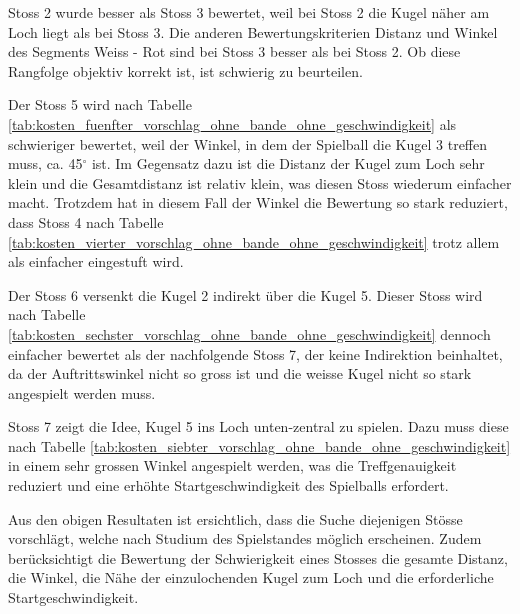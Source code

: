 Stoss 2 wurde besser als Stoss 3 bewertet, weil bei Stoss 2 die Kugel näher am Loch liegt als bei Stoss 3. Die anderen
Bewertungskriterien Distanz und Winkel des Segments \glqq Weiss - Rot\grqq{} sind bei Stoss 3 besser als bei Stoss 2.
Ob diese Rangfolge objektiv korrekt ist, ist schwierig zu beurteilen.

Der Stoss 5 wird nach Tabelle \ref{tab:kosten_fuenfter_vorschlag_ohne_bande_ohne_geschwindigkeit} als schwieriger bewertet, weil der Winkel, in dem der Spielball die Kugel 3 treffen muss, ca. 45$^{\circ}$ ist.
Im Gegensatz dazu ist die Distanz der Kugel zum Loch sehr klein und die Gesamtdistanz ist relativ klein, was diesen Stoss
wiederum einfacher macht. Trotzdem hat in diesem Fall der Winkel die Bewertung so stark reduziert, dass Stoss 4 nach
Tabelle \ref{tab:kosten_vierter_vorschlag_ohne_bande_ohne_geschwindigkeit} trotz allem als einfacher eingestuft wird.

Der Stoss 6 versenkt die Kugel 2 indirekt über die Kugel 5. Dieser Stoss wird nach
Tabelle \ref{tab:kosten_sechster_vorschlag_ohne_bande_ohne_geschwindigkeit} dennoch einfacher bewertet als der
nachfolgende Stoss 7, der keine Indirektion beinhaltet, da der Auftrittswinkel nicht so gross ist und die weisse Kugel
nicht so stark angespielt werden muss.

Stoss 7 zeigt die Idee, Kugel 5 ins Loch unten-zentral zu spielen.
Dazu muss diese nach Tabelle \ref{tab:kosten_siebter_vorschlag_ohne_bande_ohne_geschwindigkeit} in einem sehr grossen
Winkel angespielt werden, was die Treffgenauigkeit reduziert und eine erhöhte Startgeschwindigkeit des Spielballs erfordert.

Aus den obigen Resultaten ist ersichtlich, dass die Suche diejenigen Stösse vorschlägt, welche nach Studium des Spielstandes
möglich erscheinen. Zudem berücksichtigt die Bewertung der Schwierigkeit eines Stosses die gesamte Distanz, die Winkel, die Nähe
der einzulochenden Kugel zum Loch und die erforderliche Startgeschwindigkeit.

